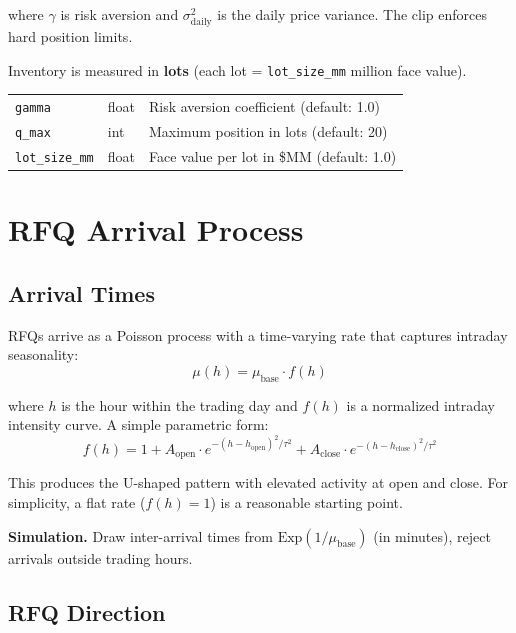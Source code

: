 \documentclass[11pt,a4paper]{article}
\begin{document}
where $\gamma$ is risk aversion and $\sigma^2_{\text{daily}}$ is the daily price variance. The clip enforces hard position limits.

Inventory is measured in \textbf{lots} (each lot = \texttt{lot\_size\_mm} million face value).

\begin{parambox}[Knobs]
\begin{tabular}{@{}lll@{}}
\texttt{gamma} & float & Risk aversion coefficient (default: 1.0) \\
\texttt{q\_max} & int & Maximum position in lots (default: 20) \\
\texttt{lot\_size\_mm} & float & Face value per lot in \$MM (default: 1.0) \\
\end{tabular}
\end{parambox}


\section{RFQ Arrival Process}\label{sec:rfq}

\subsection{Arrival Times}

RFQs arrive as a Poisson process with a time-varying rate that captures intraday seasonality:
\begin{equation}
\mu(h) = \mu_{\text{base}} \cdot f(h)
\end{equation}

where $h$ is the hour within the trading day and $f(h)$ is a normalized intraday intensity curve. A simple parametric form:
\begin{equation}
f(h) = 1 + A_{\text{open}} \cdot e^{-(h - h_{\text{open}})^2 / \tau^2} + A_{\text{close}} \cdot e^{-(h - h_{\text{close}})^2 / \tau^2}
\end{equation}

This produces the U-shaped pattern with elevated activity at open and close. For simplicity, a flat rate ($f(h) = 1$) is a reasonable starting point.

\textbf{Simulation.} Draw inter-arrival times from $\text{Exp}(1/\mu_{\text{base}})$ (in minutes), reject arrivals outside trading hours.

\subsection{RFQ Direction}
\end{document}
